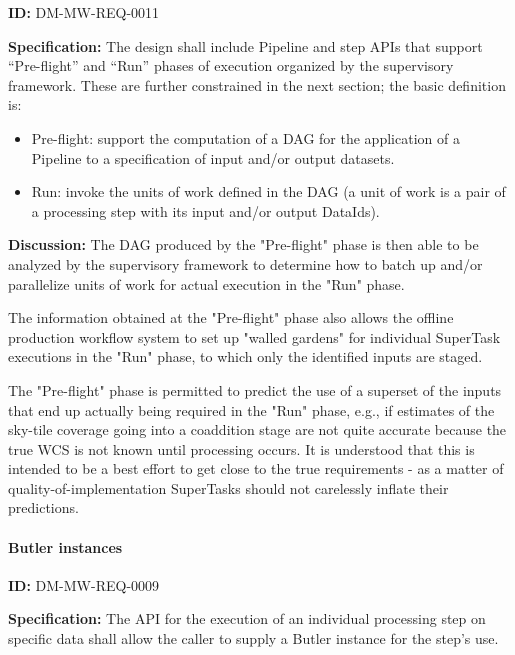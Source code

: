 \documentclass[SE,toc,lsstdraft]{lsstdoc}
\begin{document}
\label{DM-MW-REQ-0011}
\textbf{ID:} DM-MW-REQ-0011

\textbf{Specification:}
The design shall include Pipeline and step APIs that support “Pre-flight” and “Run” phases of execution organized by the supervisory framework. These are further constrained in the next section; the basic definition is:



    \begin{itemize}
\item
Pre-flight: support the computation of a DAG for the application of a Pipeline to a specification of input and/or output datasets.

\item
Run: invoke the units of work defined in the DAG (a unit of work is a pair of a processing step with its input and/or output DataIds).

    \end{itemize}

\textbf{Discussion:}
The DAG produced by the "Pre-flight" phase is then able to be analyzed by the supervisory framework to determine how to batch up and/or parallelize units of work for actual execution in the "Run" phase.

The information obtained at the "Pre-flight" phase also allows the offline production workflow system to set up "walled gardens" for individual SuperTask executions in the "Run" phase, to which only the identified inputs are staged.

The "Pre-flight" phase is permitted to predict the use of a superset of the inputs that end up actually being required in the "Run" phase, e.g., if estimates of the sky-tile coverage going into a coaddition stage are not quite accurate because the true WCS is not known until processing occurs. It is understood that this is intended to be a best effort to get close to the true requirements - as a matter of quality-of-implementation SuperTasks should not carelessly inflate their predictions.




\paragraph{Butler instances}\hfill  %

\label{DM-MW-REQ-0009}
\textbf{ID:} DM-MW-REQ-0009

\textbf{Specification:}
The API for the execution of an individual processing step on specific data shall allow the caller to supply a Butler instance for the step's use.
\end{document}
